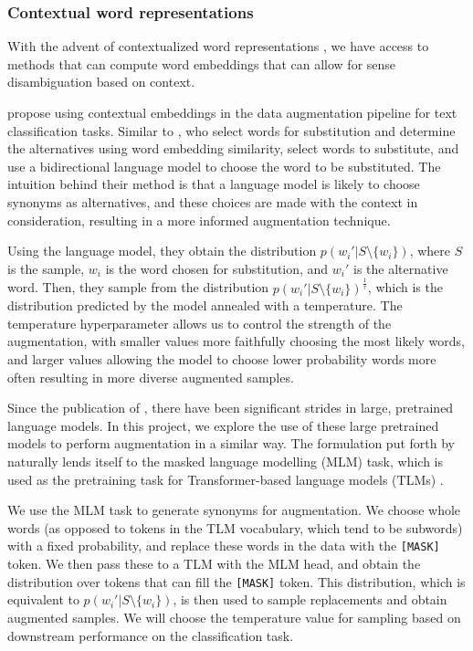 \documentclass[11pt,a4paper]{article}
\begin{document}
\subsubsection{Contextual word representations}
With the advent of contextualized word representations \cite{peters-etal-2018-deep,devlin2018bert}, we have access to methods that can compute word embeddings that can allow for sense disambiguation based on context.

\citet{kobayashi-2018-contextual} propose using contextual embeddings in the data augmentation pipeline for text classification tasks. Similar to \citet{aug2prev}, who select words for substitution and determine the alternatives using word embedding similarity, \citet{kobayashi-2018-contextual} select words to substitute, and use a bidirectional language model to choose the word to be substituted. The intuition behind their method is that a language model is likely to choose synonyms as alternatives, and these choices are made with the context in consideration, resulting in a more informed augmentation technique.

Using the language model, they obtain the distribution $p(w_i'|S \setminus \{w_i\})$, where $S$ is the sample, $w_i$ is the word chosen for substitution, and $w_i'$ is the alternative word. Then, they sample from the distribution $p(w_i'|S \setminus \{w_i\})^{\frac{1}{\tau}}$, which is the distribution predicted by the model annealed with a temperature. The temperature hyperparameter allows us to control the strength of the augmentation, with smaller values more faithfully choosing the most likely words, and larger values allowing the model to choose lower probability words more often resulting in more diverse augmented samples.
 
Since the publication of \citet{kobayashi-2018-contextual}, there have been significant strides in large, pretrained language models. In this project, we explore the use of these large pretrained models to perform augmentation in a similar way. The formulation put forth by \citet{kobayashi-2018-contextual} naturally lends itself to the masked language modelling (MLM) task, which is used as the pretraining task for Transformer-based language models (TLMs) \cite{devlin2018bert}.

We use the MLM task to generate synonyms for augmentation. We choose whole words (as opposed to tokens in the TLM vocabulary, which tend to be subwords) with a fixed probability, and replace these words in the data with the \texttt{[MASK]} token. We then pass these to a TLM with the MLM head, and obtain the distribution over tokens that can fill the \texttt{[MASK]} token. This distribution, which is equivalent to $p(w_i'|S \setminus \{w_i\})$, is then used to sample replacements and obtain augmented samples. We will choose the temperature value for sampling based on downstream performance on the classification task.
\end{document}
